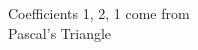 \documentclass[preview]{standalone}
\begin{document}
\begin{center}
Coefficients 1, 2, 1 come from\\Pascal's Triangle
\end{center}
\end{document}
